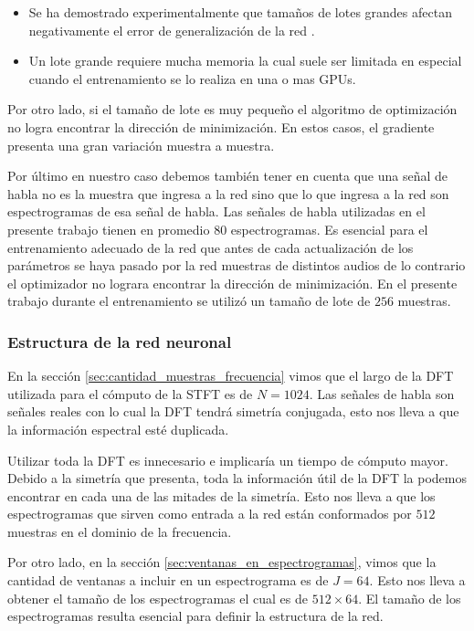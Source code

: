 \begin{itemize}
	\item Se ha demostrado experimentalmente que tamaños de lotes grandes afectan negativamente el error de generalización de la red \cite{on_large_batch_training}.
	\item Un lote grande requiere mucha memoria la cual suele ser limitada en especial cuando el entrenamiento se lo realiza en una o mas GPUs.
\end{itemize}

Por otro lado, si el tamaño de lote es muy pequeño el algoritmo de optimización no logra encontrar la dirección de minimización. En estos casos, el gradiente presenta una gran variación muestra a muestra.

Por último en nuestro caso debemos también tener en cuenta que una señal de habla no es la muestra que ingresa a la red sino que lo que ingresa a la red son espectrogramas de esa señal de habla. Las señales de habla utilizadas en el presente trabajo tienen en promedio 80 espectrogramas. Es esencial para el entrenamiento adecuado de la red que antes de cada actualización de los parámetros se haya pasado por la red muestras de distintos audios de lo contrario el optimizador no lograra encontrar la dirección de minimización. En el presente trabajo durante el entrenamiento se utilizó un tamaño de lote de $256$ muestras.

\subsubsection{Estructura de la red neuronal}

En la sección \ref{sec:cantidad_muestras_frecuencia} vimos que el largo de la DFT utilizada para el cómputo de la STFT es de $N=1024$. Las señales de habla son señales reales con lo cual la DFT tendrá simetría conjugada, esto nos lleva a que la información espectral esté duplicada.

Utilizar toda la DFT es innecesario e implicaría un tiempo de cómputo mayor. Debido a la simetría que presenta, toda la información útil de la DFT la podemos encontrar en cada una de las mitades de la simetría. Esto nos lleva a que los espectrogramas que sirven como entrada a la red están conformados por $512$ muestras en el dominio de la frecuencia.

Por otro lado, en la sección \ref{sec:ventanas_en_espectrogramas}, vimos que la cantidad de ventanas a incluir en un espectrograma es de $J=64$. Esto nos lleva a obtener el tamaño de los espectrogramas el cual es de $512 \times 64$. El tamaño de los espectrogramas resulta esencial para definir la estructura de la red.

